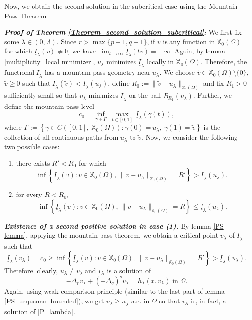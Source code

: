 \documentclass[reqno,oneside]{amsart}
\theoremstyle{definition}
\theoremstyle{remark}
\numberwithin{equation}{section}
\newcommand{\Om} {\Omega}
\newcommand{\p}{\Delta_p}
\newcommand{\qs}{(-\Delta_q)^s}
\newcommand{\rar}{\rightarrow}
\newcommand{\xo}{\mathbb{X}_0}
\newcommand{\ti}{\underline{I}_{\la}}
\newcommand{\la} {\lambda}
\begin{document}
Now, we obtain the second solution in the subcritical case using the Mountain Pass Theorem.
\vspace{5pt}

\noindent\textbf{\textit{Proof of Theorem \ref{Theorem_second_solution_subcritical}:}} We first fix some $\la\in (0, \Lambda)$. Since $r> \max\{p-1, q-1 \}$, if $v$ is any function in $\xo(\Om)$ for which $\ti (v) \not= 0$, we have $\lim_{t \rar\infty} \ti (tv) = -\infty$. Again, by lemma \ref{multiplicity_local minimizer}, $u_{\la}$ minimizes $\ti$ locally in $\xo(\Om)$. Therefore, the functional $\ti$ has a mountain pass geometry near $u_{\la}$. We choose $\tilde{v} \in \xo(\Om)\setminus \{0\}$, $\tilde{v} \geq 0$ such that $\ti(\tilde{v}) < \ti (u_{\la})$, define $R_0:= \|\tilde{v} - u_{\la} \|_{\xo(\Om)}$ and fix $R_1 >0$ sufficiently small so that $u_{\la}$ minimizes $\ti$ on the ball $\overline{B_{R_1}(u_{\la})}$. Further, we define the mountain pass level
\[c_0 = \inf_{\gamma \in \Gamma}\ \max_{t\in [0,1]}\ \ti \left(\gamma(t) \right), \]
where $\Gamma:= \left\{ \gamma \in C \left([0,1],\ \xo(\Om) \right): \gamma(0)= u_{\la},\ \gamma(1)= \tilde{v} \right\}$ is the collection of all continuous paths from $u_{\la}$ to $\tilde{v}$. Now, we consider the following two possible cases:
\begin{enumerate}
    \item there exists $R'< R_0$ for which
    \[\inf \left\{ \ti(v): v\in \xo(\Om),\ \| v- u_{\la}\|_{\xo(\Om)} =R' \right\} > \ti (u_{\la}),\]

    \item for every $R<R_0$,
    \[\inf \left\{ \ti(v): v\in \xo(\Om),\ \| v- u_{\la}\|_{\xo(\Om)} =R \right\} \leq \ti (u_{\la}).\]
\end{enumerate}

\noindent\textit{\textbf{Existence of a second positive solution in case (1).}} By lemma \ref{PS lemma}, applying the mountain pass theorem, we obtain a critical point $v_{\la}$ of $\ti$ such that
\[\ti(v_{\la}) = c_0 \geq \inf \left\{ \ti(v): v\in \xo(\Om),\ \| v- u_{\la}\|_{\xo(\Om)} =R' \right\} > \ti (u_{\la}). \]
Therefore, clearly, $u_{\la} \not= v_{\la}$ and $v_{\la}$ is a solution of 
\begin{equation}
    -\p v_{\la} + \qs v_{\la} = h_{\la} (x, v_{\la}) \text{ in } \Om.
\end{equation}
Again, using weak comparison principle (similar to the last part of lemma \ref{PS_sequence_bounded}), we get $v_{\la} \geq \underline{u}_{\la}$ a.e. in $\Om$ so that $v_{\la}$ is, in fact, a solution of \eqref{P_lambda}.
\vspace{5pt}
\end{document}
